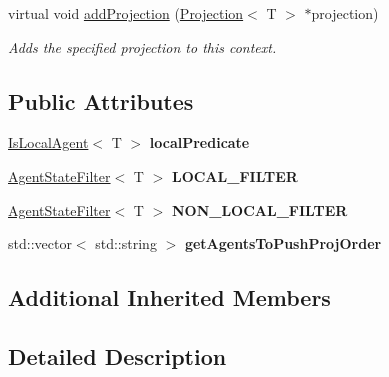 \begin{DoxyCompactItemize}
\item 
virtual void \hyperlink{classrepast_1_1_shared_context_af8f235d4d8e4b1efc548ea8a5b1ab75d}{add\-Projection} (\hyperlink{classrepast_1_1_projection}{Projection}$<$ T $>$ $\ast$projection)
\begin{DoxyCompactList}\small\item\em Adds the specified projection to this context. \end{DoxyCompactList}\end{DoxyCompactItemize}
\subsection*{Public Attributes}
\begin{DoxyCompactItemize}
\item 
\hypertarget{classrepast_1_1_shared_context_abb904bc9f1f9b37f0859bb5a81bd3376}{\hyperlink{structrepast_1_1_is_local_agent}{Is\-Local\-Agent}$<$ T $>$ {\bfseries local\-Predicate}}\label{classrepast_1_1_shared_context_abb904bc9f1f9b37f0859bb5a81bd3376}

\item 
\hypertarget{classrepast_1_1_shared_context_a96eaf0a5bebb6126e293cb4b12438a36}{\hyperlink{structrepast_1_1_agent_state_filter}{Agent\-State\-Filter}$<$ T $>$ {\bfseries L\-O\-C\-A\-L\-\_\-\-F\-I\-L\-T\-E\-R}}\label{classrepast_1_1_shared_context_a96eaf0a5bebb6126e293cb4b12438a36}

\item 
\hypertarget{classrepast_1_1_shared_context_a22f8f60308fbe5e4d02b34262a0a6078}{\hyperlink{structrepast_1_1_agent_state_filter}{Agent\-State\-Filter}$<$ T $>$ {\bfseries N\-O\-N\-\_\-\-L\-O\-C\-A\-L\-\_\-\-F\-I\-L\-T\-E\-R}}\label{classrepast_1_1_shared_context_a22f8f60308fbe5e4d02b34262a0a6078}

\item 
\hypertarget{classrepast_1_1_shared_context_af2101cd88ef2145b13a2d36a0eecbb05}{std\-::vector$<$ std\-::string $>$ {\bfseries get\-Agents\-To\-Push\-Proj\-Order}}\label{classrepast_1_1_shared_context_af2101cd88ef2145b13a2d36a0eecbb05}

\end{DoxyCompactItemize}
\subsection*{Additional Inherited Members}


\subsection{Detailed Description}
